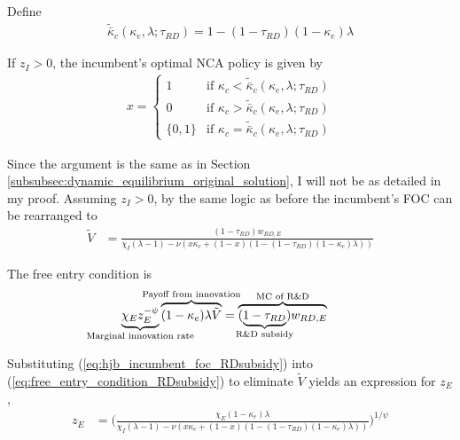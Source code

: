 \documentclass[11pt,english]{article}
\theoremstyle{remark}
\begin{document}
Define
\begin{align}
	\tilde{\bar{\kappa}}_c(\kappa_e,\lambda;\tau_{RD}) = 1 - (1-\tau_{RD})(1-\kappa_e)\lambda
\end{align} 

If $z_I > 0$, the incumbent's optimal NCA policy is given by 
\begin{align}
x = \begin{cases}
1 & \textrm{if } \kappa_{c} < \tilde{\bar{\kappa}}_c (\kappa_e, \lambda;\tau_{RD}) \\
0 & \textrm{if } \kappa_{c} > \tilde{\bar{\kappa}}_c (\kappa_e, \lambda;\tau_{RD})\\
\{0,1\} & \textrm{if } \kappa_c = \tilde{\bar{\kappa}}_c (\kappa_e, \lambda;\tau_{RD})
\end{cases} \label{eq:nca_policy_RDsubsidy}
\end{align}

Since the argument is the same as in Section \ref{subsubsec:dynamic_equilibrium_original_solution}, I will not be as detailed in my proof. Assuming $z_I > 0$, by the same logic as before the incumbent's FOC can be rearranged to
\begin{align}
	\tilde{V} &= \frac{(1-\tau_{RD})w_{RD,E}}{\chi_I(\lambda -1) - \nu (x\kappa_c + (1-x)(1 - (1-\tau_{RD})(1-\kappa_e)\lambda)) } \label{eq:hjb_incumbent_foc_RDsubsidy}
\end{align}

The free entry condition is
\begin{align}
\underbrace{\chi_E z_E^{-\psi}}_{\mathclap{\text{Marginal innovation rate}}} \overbrace{(1-\kappa_e) \lambda \tilde{V}}^{\mathclap{\text{Payoff from innovation}}} &= \overbrace{(\underbrace{1-\tau_{RD}}_{\mathclap{\text{R\&D subsidy}}})w_{RD,E}}^{\mathclap{\text{MC of R\&D}}} \label{eq:free_entry_condition_RDsubsidy}
\end{align}

Substituting (\ref{eq:hjb_incumbent_foc_RDsubsidy}) into (\ref{eq:free_entry_condition_RDsubsidy}) to eliminate $\tilde{V}$ yields an expression for $z_E$, 
\begin{align}
z_E &= \Bigg( \frac{\chi_E (1-\kappa_{e}) \lambda}{\chi_I(\lambda -1) - \nu (x\kappa_c + (1-x)(1 - (1-\tau_{RD})(1-\kappa_e)\lambda)) } \Bigg)^{1/\psi} \label{eq:effort_entrant_RDsubsidy}
\end{align}
\end{document}
